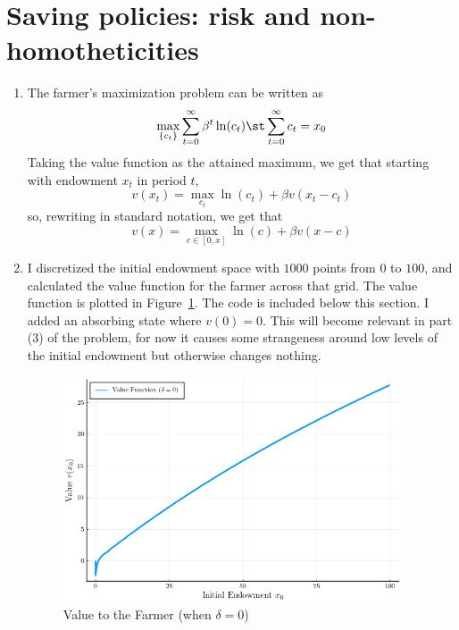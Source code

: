 \documentclass[10pt]{article}
\begin{document}
\begin{enumerate}
\end{enumerate}






\section*{Saving policies: risk and non-homotheticities}

\begin{enumerate}
	\item The farmer's maximization problem can be written as \[\max_{\{c_t\}} \sum_{t=0}^\infty \beta^t \ln(c_t) \st \sum_{t=0}^\infty c_t= x_0\]Taking the value function as the attained maximum, we get that starting with endowment $x_t$ in period $t$, \[v(x_t) = \max_{c_t} \ln(c_t) + \beta v(x_t - c_t) \]so, rewriting in standard notation, we get that \[v(x) = \max_{c\in [0,x]} \ln(c) + \beta v(x - c)\]
	\item I discretized the initial endowment space with $1000$ points from $0$ to $100$, and calculated the value function for the farmer across that grid. The value function is plotted in Figure~\ref{fig:value_initial}. The code is included below this section. I added an absorbing state where $v(0)=0$. This will become relevant in part (3) of the problem, for now it causes some strangeness around low levels of the initial endowment but otherwise changes nothing. \begin{figure}[H] \centering \includegraphics[width=10cm]{macro_hw3_code/value_function.png} \caption{Value to the Farmer (when $\delta = 0$)} \label{fig:value_initial}\end{figure}

\end{enumerate}
\end{document}
